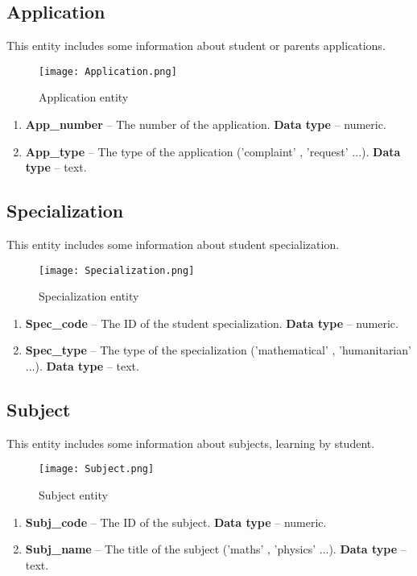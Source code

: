 \subsection*{Application}

This entity includes some information about student or parents applications.

\begin{figure}[H]
    \centering
    \texttt{[image: Application.png]}
    \caption{Application entity}
\end{figure}

\begin{enumerate}
\item \textbf{App\_number} -- The number of the application. \textbf{Data type} -- numeric.
\item \textbf{App\_type} -- The type of the application ('complaint' , 'request' ...). \textbf{Data type} -- text.
\end{enumerate}

\subsection*{Specialization}

This entity includes some information about student specialization.

\begin{figure}[H]
    \centering
    \texttt{[image: Specialization.png]}
    \caption{Specialization entity}
\end{figure}

\begin{enumerate}
\item \textbf{Spec\_code} -- The ID of the student specialization. \textbf{Data type} -- numeric.
\item \textbf{Spec\_type} -- The type of the specialization ('mathematical' , 'humanitarian' ...). \textbf{Data type} -- text.
\end{enumerate}

\subsection*{Subject}

This entity includes some information about subjects, learning by student.

\begin{figure}[H]
    \centering
    \texttt{[image: Subject.png]}
    \caption{Subject entity}
\end{figure}

\begin{enumerate}
\item \textbf{Subj\_code} -- The ID of the subject. \textbf{Data type} -- numeric.
\item \textbf{Subj\_name} -- The title of the subject ('maths' , 'physics' ...). \textbf{Data type} -- text.
\end{enumerate}